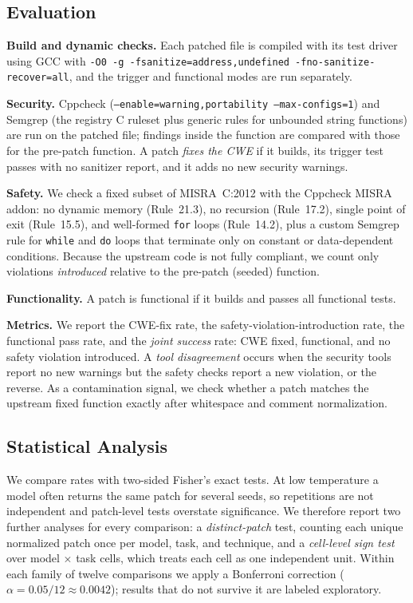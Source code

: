 \documentclass[12pt]{IEEEtran}
\begin{document}
\subsection{Evaluation}
\textbf{Build and dynamic checks.} Each patched file is compiled with its test driver using GCC with \texttt{-O0 -g -fsanitize=address,undefined -fno-sanitize-recover=all}, and the trigger and functional modes are run separately.

\textbf{Security.} Cppcheck (\texttt{--enable=warning,portability --max-configs=1}) and Semgrep (the registry C ruleset plus generic rules for unbounded string functions) are run on the patched file; findings inside the function are compared with those for the pre-patch function. A patch \emph{fixes the CWE} if it builds, its trigger test passes with no sanitizer report, and it adds no new security warnings.

\textbf{Safety.} We check a fixed subset of MISRA~C:2012 with the Cppcheck MISRA addon: no dynamic memory (Rule~21.3), no recursion (Rule~17.2), single point of exit (Rule~15.5), and well-formed \texttt{for} loops (Rule~14.2), plus a custom Semgrep rule for \texttt{while} and \texttt{do} loops that terminate only on constant or data-dependent conditions. Because the upstream code is not fully compliant, we count only violations \emph{introduced} relative to the pre-patch (seeded) function.

\textbf{Functionality.} A patch is functional if it builds and passes all functional tests.

\textbf{Metrics.} We report the CWE-fix rate, the safety-violation-introduction rate, the functional pass rate, and the \emph{joint success} rate: CWE fixed, functional, and no safety violation introduced. A \emph{tool disagreement} occurs when the security tools report no new warnings but the safety checks report a new violation, or the reverse. As a contamination signal, we check whether a patch matches the upstream fixed function exactly after whitespace and comment normalization.

\subsection{Statistical Analysis}
We compare rates with two-sided Fisher's exact tests. At low temperature a model often returns the same patch for several seeds, so repetitions are not independent and patch-level tests overstate significance. We therefore report two further analyses for every comparison: a \emph{distinct-patch} test, counting each unique normalized patch once per model, task, and technique, and a \emph{cell-level sign test} over model $\times$ task cells, which treats each cell as one independent unit. Within each family of twelve comparisons we apply a Bonferroni correction ($\alpha = 0.05/12 \approx 0.0042$); results that do not survive it are labeled exploratory.
\end{document}
